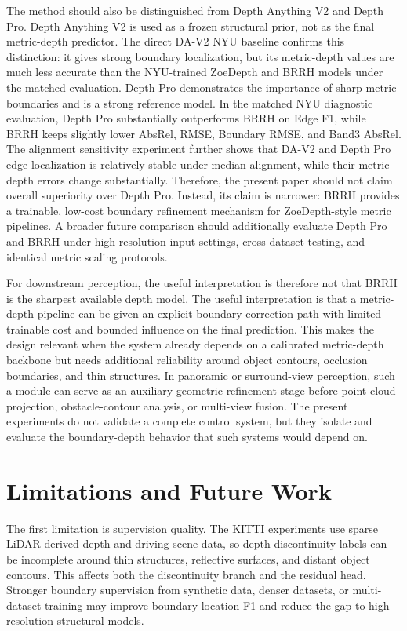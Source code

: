 \documentclass{ieeeaccess}
\begin{document}
The method should also be distinguished from Depth Anything V2 and Depth Pro. Depth Anything V2 is used as a frozen structural prior, not as the final metric-depth predictor. The direct DA-V2 NYU baseline confirms this distinction: it gives strong boundary localization, but its metric-depth values are much less accurate than the NYU-trained ZoeDepth and BRRH models under the matched evaluation. Depth Pro demonstrates the importance of sharp metric boundaries and is a strong reference model. In the matched NYU diagnostic evaluation, Depth Pro substantially outperforms BRRH on Edge F1, while BRRH keeps slightly lower AbsRel, RMSE, Boundary RMSE, and Band3 AbsRel. The alignment sensitivity experiment further shows that DA-V2 and Depth Pro edge localization is relatively stable under median alignment, while their metric-depth errors change substantially. Therefore, the present paper should not claim overall superiority over Depth Pro. Instead, its claim is narrower: BRRH provides a trainable, low-cost boundary refinement mechanism for ZoeDepth-style metric pipelines. A broader future comparison should additionally evaluate Depth Pro and BRRH under high-resolution input settings, cross-dataset testing, and identical metric scaling protocols.

For downstream perception, the useful interpretation is therefore not that BRRH is the sharpest available depth model. The useful interpretation is that a metric-depth pipeline can be given an explicit boundary-correction path with limited trainable cost and bounded influence on the final prediction. This makes the design relevant when the system already depends on a calibrated metric-depth backbone but needs additional reliability around object contours, occlusion boundaries, and thin structures. In panoramic or surround-view perception, such a module can serve as an auxiliary geometric refinement stage before point-cloud projection, obstacle-contour analysis, or multi-view fusion. The present experiments do not validate a complete control system, but they isolate and evaluate the boundary-depth behavior that such systems would depend on.

\section{Limitations and Future Work}

The first limitation is supervision quality. The KITTI experiments use sparse LiDAR-derived depth and driving-scene data, so depth-discontinuity labels can be incomplete around thin structures, reflective surfaces, and distant object contours. This affects both the discontinuity branch and the residual head. Stronger boundary supervision from synthetic data, denser datasets, or multi-dataset training may improve boundary-location F1 and reduce the gap to high-resolution structural models.
\end{document}
